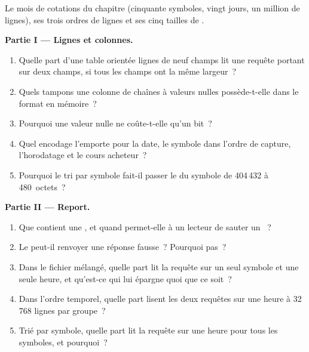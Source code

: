 \begin{problem}\label{pb:pl:columnar-formats:1}
Le mois de cotations du chapitre (cinquante symboles, vingt jours, un million de lignes), ses trois ordres de lignes et ses cinq tailles de .

\medskip\noindent\textbf{Partie I --- Lignes et colonnes.}
\begin{enumerate}
\item Quelle part d'une table orientée lignes de neuf champs lit une requête portant sur deux champs, si tous les champs ont la même largeur~?
\item Quels tampons une colonne de chaînes à valeurs nulles possède-t-elle dans le format en mémoire~?
\item Pourquoi une valeur nulle ne coûte-t-elle qu'un bit~?
\item Quel encodage l'emporte pour la date, le symbole dans l'ordre de capture, l'horodatage et le cours acheteur~?
\item Pourquoi le tri par symbole fait-il passer le  du symbole de 404\,432 à 480~octets~?
\end{enumerate}

\medskip\noindent\textbf{Partie II --- Report.}
\begin{enumerate}[resume]
\item Que contient une , et quand permet-elle à un lecteur de sauter un ~?
\item Le  peut-il renvoyer une réponse fausse~? Pourquoi pas~?
\item Dans le fichier mélangé, quelle part lit la requête sur un seul symbole et une seule heure, et qu'est-ce qui lui épargne quoi que ce soit~?
\item Dans l'ordre temporel, quelle part lisent les deux requêtes sur une heure à 32\,768 lignes par groupe~?
\item Trié par symbole, quelle part lit la requête sur une heure pour tous les symboles, et pourquoi~?
\end{enumerate}


\end{problem}
